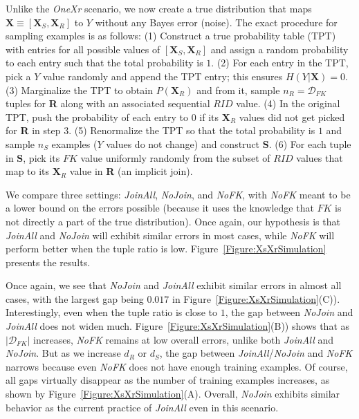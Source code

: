 \documentclass{vldb}
\begin{document}
Unlike the \textit{OneXr} scenario, we now create a true distribution that maps $\textbf{X} \equiv [\textbf{X}_S, \textbf{X}_R]$ to $Y$ without any Bayes error (noise).
The exact procedure for sampling examples is as follows: (1) Construct a true probability table (TPT) with entries for all possible values of 
$[\textbf{X}_S, \textbf{X}_R]$ and assign a random probability to each entry such that the total probability is $1$.
(2) For each entry in the TPT, pick a $Y$ value randomly and append the TPT entry; this ensures $H(Y|\textbf{X}) = 0$.
(3) Marginalize the TPT to obtain $P(\textbf{X}_R)$ and from it, sample $n_R = \mathcal{D}_{FK}$ tuples for \textbf{R} along with an associated sequential $RID$ value.
(4) In the original TPT, push the probability of each entry to $0$ if its $\textbf{X}_R$ values did not get picked for \textbf{R} in step 3.
(5) Renormalize the TPT so that the total probability is $1$ and sample $n_S$ examples ($Y$ values do not change) and construct \textbf{S}.
(6) For each tuple in \textbf{S}, pick its $FK$ value uniformly randomly from the subset of $RID$ values that map to its $\textbf{X}_R$ value in \textbf{R} (an implicit join).

We compare three settings: \textit{JoinAll}, \textit{NoJoin}, and \textit{NoFK}, with \textit{NoFK} meant to be a lower bound on the errors possible (because 
it uses the knowledge that $FK$ is not directly a part of the true distribution). Once again, our hypothesis is that \textit{JoinAll} and \textit{NoJoin} will exhibit similar 
errors in most cases, while \textit{NoFK} will perform better when the tuple ratio is low. Figure~\ref{Figure:XsXrSimulation} presents the results.

Once again, we see that \textit{NoJoin} and \textit{JoinAll} exhibit similar errors in almost all cases, with the largest gap being $0.017$ in Figure~\ref{Figure:XsXrSimulation}(C)).
Interestingly, even when the tuple ratio is close to $1$, the gap between \textit{NoJoin} and \textit{JoinAll} does not widen much. 
Figure~\ref{Figure:XsXrSimulation}(B)) shows that as $|\mathcal{D}_{FK}|$ increases, \textit{NoFK} remains at low overall errors, unlike both \textit{JoinAll} and \textit{NoJoin}.
But as we increase $d_R$ or $d_S$, the gap between \textit{JoinAll}/\textit{NoJoin} and \textit{NoFK} narrows because even \textit{NoFK} does not have enough training examples.
Of course, all gaps virtually disappear as the number of training examples increases, as shown by Figure~\ref{Figure:XsXrSimulation}(A).
Overall, \textit{NoJoin} exhibits similar behavior as the current practice of \textit{JoinAll} even in this scenario.
\end{document}
